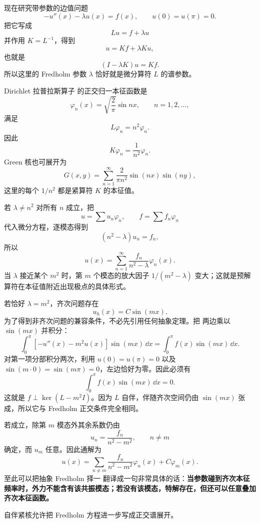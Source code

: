 现在研究带参数的边值问题
\begin{equation}
-u''(x)-\lambda u(x)=f(x),
\qquad u(0)=u(\pi)=0.
\label{eq:sturm-liouville-resonance}
\end{equation}
把它写成
\[
Lu=f+\lambda u
\]
并作用 $K=L^{-1}$，得到
\[
u=Kf+\lambda Ku,
\]
也就是
\[
(I-\lambda K)u=Kf.
\]
所以这里的 Fredholm 参数 $\lambda$ 恰好就是微分算符 $L$ 的谱参数。

Dirichlet 拉普拉斯算子 的正交归一本征函数是
\[
\varphi_n(x)=\sqrt{\frac2\pi}\sin nx,
\qquad n=1,2,\dots,
\]
满足
\[
L\varphi_n=n^2\varphi_n.
\]
因此
\[
K\varphi_n=\frac1{n^2}\varphi_n.
\]
Green 核也可展开为
\begin{equation*}G(x,y)
=\sum_{n=1}^\infty
\frac{2}{\pi n^2}
\sin(nx)\sin(ny),\end{equation*}
这里的每个 $1/n^2$ 都是紧算符 $K$ 的本征值。

若 $\lambda\neq n^2$ 对所有 $n$ 成立，把
\[
u=\sum u_n\varphi_n,
\qquad
f=\sum f_n\varphi_n
\]
代入微分方程，逐模态得到
\[
(n^2-\lambda)u_n=f_n,
\]
所以
\begin{equation*}{
u(x)
=\sum_{n=1}^\infty
\frac{f_n}{n^2-\lambda}\varphi_n(x)
}.\end{equation*}
当 $\lambda$ 接近某个 $m^2$ 时，第 $m$ 个模态的放大因子 $1/(m^2-\lambda)$ 变大；这就是预解算符在本征值附近出现极点的具体形式。

若恰好 $\lambda=m^2$，齐次问题存在
\[
u_h(x)=C\sin(mx).
\]
为了得到非齐次问题的兼容条件，不必先引用任何抽象定理。把 两边乘以 $\sin(mx)$ 并积分：
\[
\int_0^\pi[-u''(x)-m^2u(x)]\sin(mx)\,\dd x
=\int_0^\pi f(x)\sin(mx)\,\dd x.
\]
对第一项分部积分两次，利用 $u(0)=u(\pi)=0$ 以及 $\sin(m\cdot0)=\sin(m\pi)=0$，左边恰好为零。因此必须有
\begin{equation}
{
\int_0^\pi f(x)\sin(mx)\,\dd x=0
}.
\label{eq:sturm-liouville-compatibility}
\end{equation}
这就是 $f\perp\ker(L-m^2I)$。因为 $L$ 自伴，伴随齐次空间仍由 $\sin(mx)$ 张成，所以它与 Fredholm 正交条件完全相同。

若成立，除第 $m$ 模态外其余系数仍由
\[
u_n=\frac{f_n}{n^2-m^2},
\qquad n\neq m
\]
确定，而 $u_m$ 任意。因此通解为
\[
u(x)
=\sum_{n\neq m}
\frac{f_n}{n^2-m^2}\varphi_n(x)
+C\varphi_m(x).
\]
至此可以把抽象 Fredholm 择一 翻译成一句非常具体的话：\textbf{当参数碰到齐次本征频率时，外力不能含有该共振模态；若没有该模态，特解存在，但还可以任意叠加齐次本征函数。}

自伴紧核允许把 Fredholm 方程进一步写成正交谱展开。

